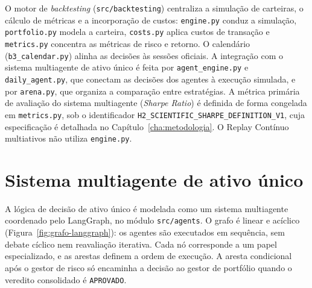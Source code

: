 O motor de \textit{backtesting} (\texttt{src/backtesting}) centraliza a simulação de carteiras, o cálculo de métricas e a incorporação de custos: \texttt{engine.py} conduz a simulação, \texttt{portfolio.py} modela a carteira, \texttt{costs.py} aplica custos de transação e \texttt{metrics.py} concentra as métricas de risco e retorno. O calendário (\texttt{b3\_calendar.py}) alinha as decisões às sessões oficiais. A integração com o sistema multiagente de ativo único é feita por \texttt{agent\_engine.py} e \texttt{daily\_agent.py}, que conectam as decisões dos agentes à execução simulada, e por \texttt{arena.py}, que organiza a comparação entre estratégias. A métrica primária de avaliação do sistema multiagente (\textit{Sharpe Ratio}) é definida de forma congelada em \texttt{metrics.py}, sob o identificador \texttt{H2\_SCIENTIFIC\_SHARPE\_DEFINITION\_V1}, cuja especificação é detalhada no Capítulo~\ref{cha:metodologia}. O Replay Contínuo multiativos não utiliza \texttt{engine.py}.

\section{Sistema multiagente de ativo único}
\label{sec:arq-ativo-unico}

A lógica de decisão de ativo único é modelada como um sistema multiagente coordenado pelo LangGraph, no módulo \texttt{src/agents}. O grafo é linear e acíclico (Figura~\ref{fig:grafo-langgraph}): os agentes são executados em sequência, sem debate cíclico nem reavaliação iterativa. Cada nó corresponde a um papel especializado, e as arestas definem a ordem de execução. A aresta condicional após o gestor de risco só encaminha a decisão ao gestor de portfólio quando o veredito consolidado é \texttt{APROVADO}.

